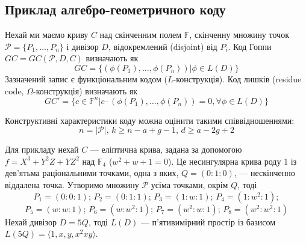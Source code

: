 \documentclass[a4paper,14pt,oneside]{extarticle}
\begin{document}
\subsection{Приклад алгебро-геометричного коду}
Нехай ми маємо криву $C$ над скінченним полем $\mathbb{F}$, скінченну множину точок $\mathcal{P} = \{P_1, \dots , P_n \}$ і дивізор $D$, відокремлений (disjoint) від $P_i$. 
Код Гоппи $GC = GC(\mathcal{P}, D, C)$ визначають як
$$GC = \{ (\phi(P_1), \dots , \phi(P_n)) | \phi \in L(D) \}$$
Зазначений запис є функціональним кодом ($L$-конструкція). Код лишків (residue code, $\Omega$-конструкція) визначають як
$$GC' = \{ c \in \mathbb{F}^n | c \cdot (\phi(P_1), \dots , \phi(P_n)) = 0, \forall \phi \in L(D) \}$$

Конструктивні характеристики коду можна оцінити такими співвідношеннями:
$$n=|\mathcal{P}|, \, k \ge n-a+g-1, \, d \ge a-2g+2$$

Для прикладу нехай $C$ --- еліптична крива, задана за допомогою $f=X^3+Y^2Z+YZ^2$ над $\mathbb{F}_4$ ($w^2+w+1=0$). 
Це несингулярна крива роду 1 із дев'ятьма раціональними точками, одна з яких, $Q=(0:1:0)$, --- нескінченно віддалена точка. 
Утворимо множину $\mathcal{P}$ усіма точками, окрім $Q$, тоді
$$P_1 = (0 : 0 : 1); \, P_2 = (0 : 1 : 1); \, P_3 = (1 : w : 1); \, P_4 = (1 : w^2 : 1);$$ 
$$P_5 = (w : w : 1); \, P_6 = (w : w^2 : 1); \, P_7 = (w^2 : w : 1); \, P_8 = (w^2 : w^2 : 1)$$
Нехай дивізор $D=5Q$, тоді $L(D)$ --- п'ятивимірний простір із базисом $L(5Q) = \langle 1, x, y, x^2 xy \rangle$.
\end{document}
